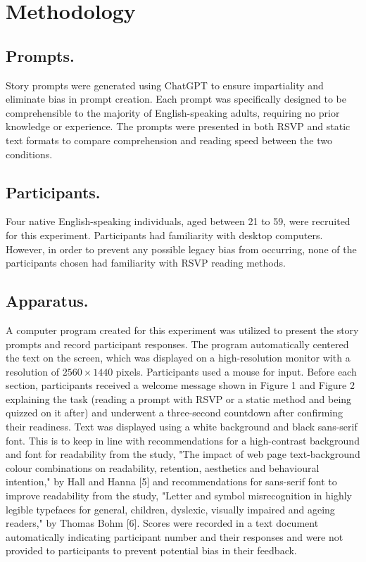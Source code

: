 \documentclass[manuscript,screen]{acmart}
\begin{document}
\section{Methodology}
\subsection{Prompts.} 
Story prompts were generated using ChatGPT to ensure impartiality and eliminate bias in prompt creation. Each prompt was specifically designed to be comprehensible to the majority of English-speaking adults, requiring no prior knowledge or experience. The prompts were presented in both RSVP and static text formats to compare comprehension and reading speed between the two conditions.

\subsection{Participants.} 
Four native English-speaking individuals, aged between 21 to 59, were recruited for this experiment. Participants had familiarity with desktop computers. However, in order to prevent  any possible legacy bias from occurring, none of the participants chosen had familiarity with RSVP reading methods.

\subsection{Apparatus.} 
A computer program created for this experiment was utilized to present the story prompts and record participant responses. The program automatically centered the text on the screen, which was displayed on a high-resolution monitor with a resolution of $2560 \times 1440$ pixels. Participants used a mouse for input. Before each section, participants received a welcome message shown in Figure 1 and Figure 2 explaining the task (reading a prompt with RSVP or a static method and being quizzed on it after) and underwent a three-second countdown after confirming their readiness. Text was displayed using a white background and black sans-serif font. This is to keep in line with recommendations for a high-contrast background and font for readability from the study, "The impact of web page text-background colour combinations on readability, retention, aesthetics and behavioural intention," by Hall and Hanna [5] and recommendations for sans-serif font to improve readability from the study, "Letter and symbol misrecognition in highly legible typefaces for general, children, dyslexic, visually impaired and ageing readers," by Thomas Bohm [6]. Scores were recorded in a text document automatically indicating participant number and their responses and were not provided to participants to prevent potential bias in their feedback.
\end{document}
